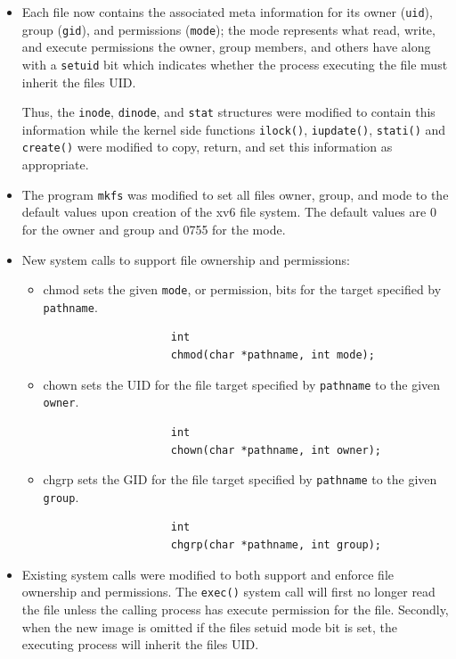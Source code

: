 \documentclass[11pt,letterpaper]{report}
\begin{document}
	\begin{itemize}
	
	
	\item Each file now contains the associated meta information for its owner ({\tt uid}), group ({\tt gid}), and permissions ({\tt mode}); the mode represents what read, write, and execute permissions the owner, group members, and others have along with a {\tt setuid} bit which indicates whether the process executing the file must inherit the files UID.  
	
	Thus, the {\tt inode}, {\tt dinode}, 
	and {\tt stat} structures were modified to contain this information while the kernel side functions {\tt ilock()}, {\tt iupdate()}, {\tt stati()} and {\tt create()} were modified to copy, return, and set
	this information as appropriate.
	
	\item The program {\tt mkfs} was modified to set all files owner, group, and mode to the default values upon creation of the xv6 file system. The default values are 0 for the owner and group
	and 0755 for the mode.
	\item New system calls to support file ownership and permissions:
	 	\begin{itemize}
			\item chmod sets the given {\tt mode}, or permission, bits for the target specified by {\tt pathname}.
				\begin{verbatim}
					int
					chmod(char *pathname, int mode);
				\end{verbatim}
				
			\item chown sets the UID for the file target specified by {\tt pathname} to the given {\tt owner}.
				\begin{verbatim}
					int
					chown(char *pathname, int owner);
				\end{verbatim}
			
			\item chgrp sets the GID for the file target specified by {\tt pathname} to the given {\tt group}.
				\begin{verbatim}
					int
					chgrp(char *pathname, int group);
				\end{verbatim}
					
		 \end{itemize}
	
	\item  Existing system calls were modified to both support and enforce file ownership and permissions. 
		The {\tt exec()} system call will first no longer read the file unless the calling process has execute permission for the file. Secondly, when the new image is omitted if the files setuid 
		mode bit is set, the executing process will inherit the files UID.  
			

\end{itemize}
\end{document}
